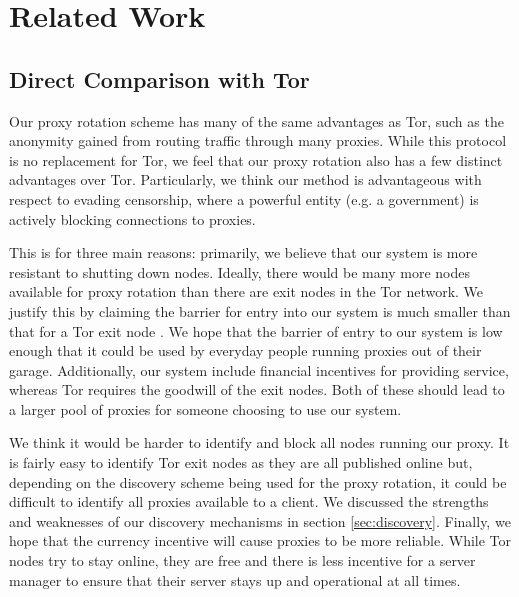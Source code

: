 \section{Related Work}
\label{sec:related}

\subsection{Direct Comparison with Tor}

Our proxy rotation scheme has many of the same advantages as Tor, such as the anonymity gained from routing traffic through many proxies. While this protocol is no replacement for Tor, we feel that our proxy rotation also has a few distinct advantages over Tor. Particularly, we think our method is advantageous with respect to evading censorship, where a powerful entity (e.g. a government) is actively blocking connections to proxies.

This is for three main reasons: primarily, we believe that our system is more resistant to shutting down nodes. Ideally, there would be many more nodes available for proxy rotation than there are exit nodes in the Tor network. We justify this by claiming the barrier for entry into our system is much smaller than that for a Tor exit node . We hope that the barrier of entry to our system is low enough that it could be used by everyday people running proxies out of their garage.  Additionally, our system include financial incentives for providing service, whereas Tor requires the goodwill of the exit nodes. Both of these should lead to a larger pool of proxies for someone choosing to use our system.

We think it would be harder to identify and block all nodes running our proxy. It is fairly easy to identify Tor exit nodes as they are all published online\cite{tor:node} but, depending on the discovery scheme being used for the proxy rotation, it could be difficult to identify all proxies available to a client. We discussed the strengths and weaknesses of our discovery mechanisms in section \ref{sec:discovery}. Finally, we hope that the currency incentive will cause proxies to be more reliable. While Tor nodes try to stay online, they are free and there is less incentive for a server manager to ensure that their server stays up and operational at all times.


